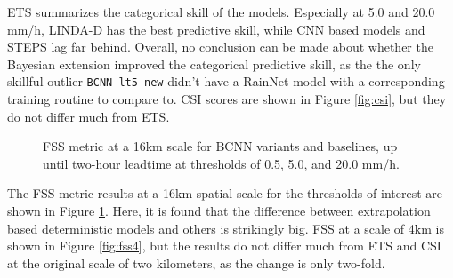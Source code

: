  ETS summarizes the categorical skill of the models. Especially at 5.0 and 20.0 mm/h, LINDA-D has the best predictive skill, while CNN based models and STEPS lag far behind. Overall, no conclusion can be made about whether the Bayesian extension improved the categorical predictive skill, as the the only skillful outlier \texttt{BCNN lt5 new} didn't have a RainNet model with a corresponding training routine to compare to. CSI scores are shown in Figure \ref{fig:csi}, but they do not differ much from ETS. 

\begin{figure}[H]
	\caption{FSS metric at a 16km scale for BCNN variants and baselines, up until two-hour leadtime at thresholds of 0.5, 5.0, and 20.0 mm/h.}
	\label{fig:fss16}
\end{figure}

The FSS metric results at a 16km spatial scale for the thresholds of interest are shown in Figure \ref{fig:fss16}. Here, it is found that the difference between extrapolation based deterministic models and others is strikingly big. FSS at a scale of 4km is shown in Figure \ref{fig:fss4}, but the results do not differ much from ETS and CSI at the original scale of two kilometers, as the change is only two-fold. 

